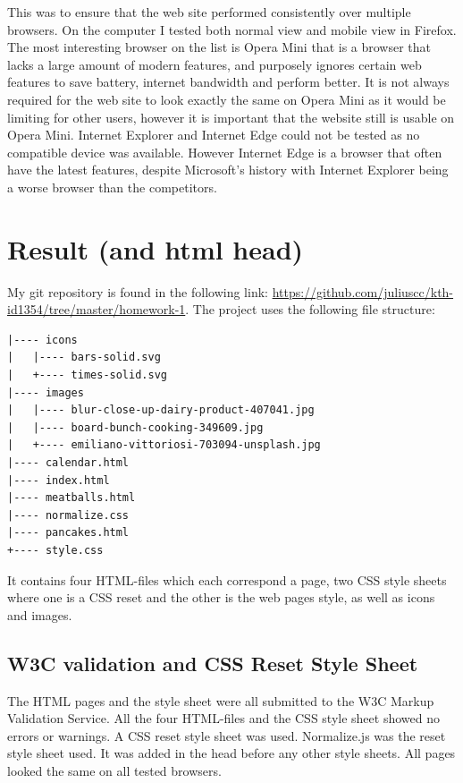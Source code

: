 \documentclass[a4paper]{scrartcl}
\begin{document}
This was to ensure that the web site performed consistently over multiple browsers. On the computer I tested both normal view and mobile view in Firefox. The most interesting browser on the list is Opera Mini that is a browser that lacks a large amount of modern features, and purposely ignores certain web features to save battery, internet bandwidth and perform better. It is not always required for the web site to look exactly the same on Opera Mini as it would be limiting for other users, however it is important that the website still is usable on Opera Mini. Internet Explorer and Internet Edge could not be tested as no compatible device was available. However Internet Edge is a browser that often have the latest features, despite Microsoft's history with Internet Explorer being a worse browser than the competitors.

\section{Result (and html head)}

My git repository is found in the following link: \newline\href{https://github.com/juliuscc/kth-id1354/tree/master/homework-1}{https://github.com/juliuscc/kth-id1354/tree/master/homework-1}. The project uses the following file structure:

\begin{verbatim}
|---- icons
|   |---- bars-solid.svg
|   +---- times-solid.svg
|---- images
|   |---- blur-close-up-dairy-product-407041.jpg
|   |---- board-bunch-cooking-349609.jpg
|   +---- emiliano-vittoriosi-703094-unsplash.jpg
|---- calendar.html
|---- index.html
|---- meatballs.html
|---- normalize.css
|---- pancakes.html
+---- style.css
\end{verbatim}

\noindent
It contains four HTML-files which each correspond a page, two CSS style sheets where one is a CSS reset and the other is the web pages style, as well as icons and images.

\subsection{W3C validation and CSS Reset Style Sheet}
The HTML pages and the style sheet were all submitted to the W3C Markup Validation Service. All the four HTML-files and the CSS style sheet showed no errors or warnings. A CSS reset style sheet was used. Normalize.js was the reset style sheet used. It was added in the head before any other style sheets. All pages looked the same on all tested browsers.
\end{document}
